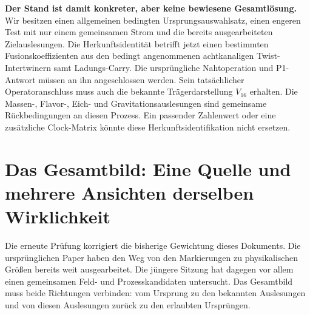 \textbf{Der Stand ist damit konkreter, aber keine bewiesene Gesamtlösung.} Wir besitzen einen allgemeinen bedingten Ursprungsauswahlsatz, einen engeren Test mit nur einem gemeinsamen Strom und die bereits ausgearbeiteten Zielauslesungen. Die Herkunftsidentität betrifft jetzt einen bestimmten Fusionskoeffizienten aus den bedingt angenommenen achtkanaligen Twist-Intertwinern samt Ladungs-Carry. Die ursprüngliche Nahtoperation und P1-Antwort müssen an ihn angeschlossen werden. Sein tatsächlicher Operatoranschluss muss auch die bekannte Trägerdarstellung $V_{16}$ erhalten. Die Massen-, Flavor-, Eich- und Gravitationsauslesungen sind gemeinsame Rückbedingungen an diesen Prozess. Ein passender Zahlenwert oder eine zusätzliche Clock-Matrix könnte diese Herkunftsidentifikation nicht ersetzen.

\section{Das Gesamtbild: Eine Quelle und mehrere Ansichten derselben Wirklichkeit}\label{sec:bigpicture}


Die erneute Prüfung korrigiert die bisherige Gewichtung dieses Dokuments. Die ursprünglichen Paper haben den Weg von den Markierungen zu physikalischen Größen bereits weit ausgearbeitet. Die jüngere Sitzung hat dagegen vor allem einen gemeinsamen Feld- und Prozesskandidaten untersucht. Das Gesamtbild muss beide Richtungen verbinden: vom Ursprung zu den bekannten Auslesungen und von diesen Auslesungen zurück zu den erlaubten Ursprüngen.

